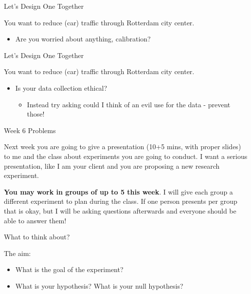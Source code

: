 \documentclass{beamer}
\begin{document}
\begin{frame}{Let's Design One Together}

You want to reduce (car) traffic through Rotterdam city center.
\begin{itemize}
\item Are you worried about anything, calibration?
\end{itemize}


\end{frame}


\begin{frame}{Let's Design One Together}

You want to reduce (car) traffic through Rotterdam city center.
\begin{itemize}
\item Is your data collection ethical?
\begin{itemize}
\item Instead try asking could I think of an evil use for the data - prevent those!
\end{itemize}
\end{itemize}


\end{frame}




\begin{frame}{Week 6 Problems}

Next week you are going to give a presentation (10+5 mins, with proper slides) to me and the class about experiments you are going to conduct.  I want a serious presentation, like I am your client and you are proposing a new research experiment.


\vspace{5mm}

\textbf{You may work in groups of up to 5 this week}.  I will give each group a different experiment to plan during the class.  If one person presents per group that is okay, but I will be asking questions afterwards and everyone should be able to answer them!

\end{frame}


\begin{frame}{What to think about?}

The aim:

\begin{itemize}
\item What is the goal of the experiment?
\item What is your hypothesis?  What is your null hypothesis?
\end{itemize}

\end{frame}
\end{document}
